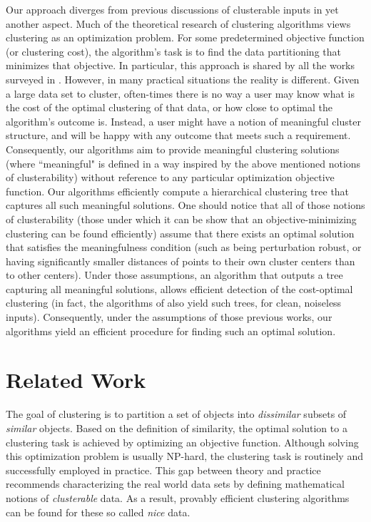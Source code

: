 \documentclass[12pt]{article}
\begin{document}
Our approach diverges from previous discussions of clusterable inputs in yet another aspect. Much of the theoretical research of clustering algorithms views clustering as an optimization problem. For some predetermined objective function (or clustering cost), the algorithm's task is to find the data partitioning that minimizes that objective. In particular, this approach is shared by all the works surveyed in \cite{ben2015computational}. However, in many practical situations the reality is different. Given a large data set to cluster, often-times there is no way a user may know what is the cost of the optimal clustering of that data, or how close to optimal the algorithm's outcome is. Instead, a user might have a notion of meaningful cluster structure, and will be happy with any outcome that meets such a requirement. Consequently, our algorithms aim to provide meaningful clustering solutions (where ``meaningful" is defined in a way inspired by the above mentioned notions of clusterability) without reference to any particular optimization objective function. Our algorithms efficiently compute a hierarchical clustering tree that captures all such meaningful solutions. One should notice that all of those notions of clusterability (those under which it can be show that an objective-minimizing clustering can be found efficiently) assume that there exists an optimal solution that satisfies the meaningfulness condition (such as being perturbation robust, or having significantly smaller distances of points to their own cluster centers than to other centers). Under those assumptions, an algorithm that outputs a tree capturing all meaningful solutions, allows efficient detection of the cost-optimal clustering (in fact, the algorithms of \cite{balcan2012clustering} also yield such trees, for clean, noiseless inputs). Consequently, under the assumptions of those previous works, our algorithms yield an efficient procedure for finding such an optimal solution.

\section{Related Work}
The goal of clustering is to partition a set of objects into {\em dissimilar} subsets of {\em similar} objects. Based on the definition of similarity, the optimal solution to a clustering task is achieved by optimizing an objective function. Although solving this optimization problem is usually NP-hard, the clustering task is routinely and successfully employed in practice. This gap between theory and practice recommends characterizing the real world data sets by defining mathematical notions of {\em clusterable} data. As a result, provably efficient clustering algorithms can be found for these so called {\em nice} data.  
\end{document}
